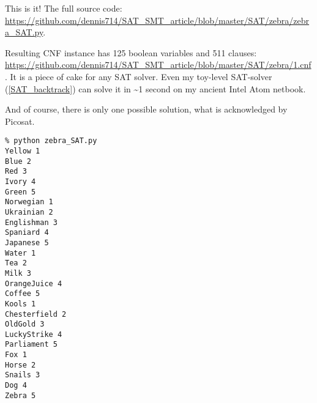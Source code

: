 This is it!
The full source code: \url{https://github.com/dennis714/SAT_SMT_article/blob/master/SAT/zebra/zebra_SAT.py}.

Resulting CNF instance has 125 boolean variables and 511 clauses: \\
\url{https://github.com/dennis714/SAT_SMT_article/blob/master/SAT/zebra/1.cnf}.
It is a piece of cake for any SAT solver.
Even my toy-level SAT-solver (\ref{SAT_backtrack}) can solve it in \textasciitilde{}1 second on my ancient Intel Atom netbook.

And of course, there is only one possible solution, what is acknowledged by Picosat.

\begin{lstlisting}
% python zebra_SAT.py
Yellow 1
Blue 2
Red 3
Ivory 4
Green 5
Norwegian 1
Ukrainian 2
Englishman 3
Spaniard 4
Japanese 5
Water 1
Tea 2
Milk 3
OrangeJuice 4
Coffee 5
Kools 1
Chesterfield 2
OldGold 3
LuckyStrike 4
Parliament 5
Fox 1
Horse 2
Snails 3
Dog 4
Zebra 5
\end{lstlisting}

